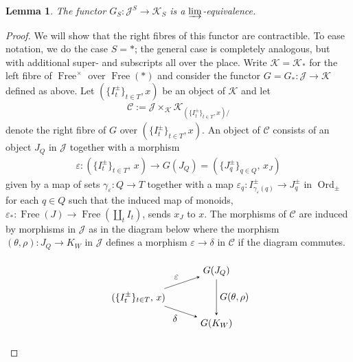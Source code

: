 \documentclass[12pt, reqno]{amsart}
\theoremstyle{plain}
\newtheorem{lemma}[theorem]{Lemma}
\theoremstyle{definition}
\renewcommand{\epsilon}{\varepsilon}
\begin{document}
\begin{lemma}\label{cofinal}
The functor $G_S\colon \mathcal{J}^S\rightarrow \mathcal{K}_S$ is a $\varinjlim$-equivalence.
\end{lemma}
\begin{proof}
We will show that the right fibres of this functor are contractible. To ease notation, we do the case $S=\ast$; the general case is completely analogous, but with additional super- and subscripts all over the place. Write $\mathcal{K}=\mathcal{K}_\ast$ for the left fibre of $\operatorname{Free}^\times $ over $\operatorname{Free}(\ast)$ and consider the functor $G=G_\ast\colon \mathcal{J}\rightarrow \mathcal{K}$ defined as above. Let $(\{I_t^\pm\}_{t\in T},x)$ be an object of $\mathcal{K}$ and let
\begin{align*}
\mathcal{C}:=\mathcal{J} \mathop{\times}_{\mathcal{K}} \mathcal{K}_{(\{I_t^\pm\}_{t\in T},x)/}
\end{align*}
denote the right fibre of $G$ over $(\{I_t^\pm\}_{t\in T},x)$. An object of $\mathcal{C}$ consists of an object $J_Q$ in $\mathcal{J}$ together with a morphism
\begin{align*}
\epsilon\colon (\{I_t^\pm\}_{t\in T}, \, x)\rightarrow G(J_Q)=(\{J_q^\pm\}_{q\in Q}, \, x_J)
\end{align*}
given by a map of sets $\gamma_\epsilon\colon Q\rightarrow T$ together with a map $\epsilon_q\colon I_{\gamma_\epsilon(q)}^\pm \rightarrow J_q^\pm$ in $\operatorname{Ord}_\pm$ for each $q\in Q$ such that the induced map of monoids, $\epsilon_*\colon \operatorname{Free}(J)\rightarrow \operatorname{Free}(\coprod_{t}I_t)$, sends $x_J$ to $x$. The morphisms of $\mathcal{C}$ are induced by morphisms in $\mathcal{J}$ as in the diagram below where the morphism $(\theta,\rho)\colon J_Q\rightarrow K_W$ in $\mathcal{J}$ defines a morphism $\epsilon\rightarrow \delta$ in $\mathcal{C}$ if the diagram commutes.
\begin{center}
\begin{equation}\label{morphism}
\begin{tikzpicture}[baseline=(current  bounding  box.center)]
\matrix (m) [matrix of math nodes,row sep=1em,column sep=3em]
{
& G(J_Q) \\
(\{I_t^\pm\}_{t\in T}, \, x) & \\
& G(K_W) \\
};
\path[-stealth]
(m-2-1) edge node[above left]{$\epsilon$} (m-1-2) edge node[below left]{$\delta$} (m-3-2)
(m-1-2) edge node[right]{$G(\theta,\rho)$} (m-3-2)
;
\end{tikzpicture}
\end{equation}
\end{center}


\end{proof}
\end{document}
